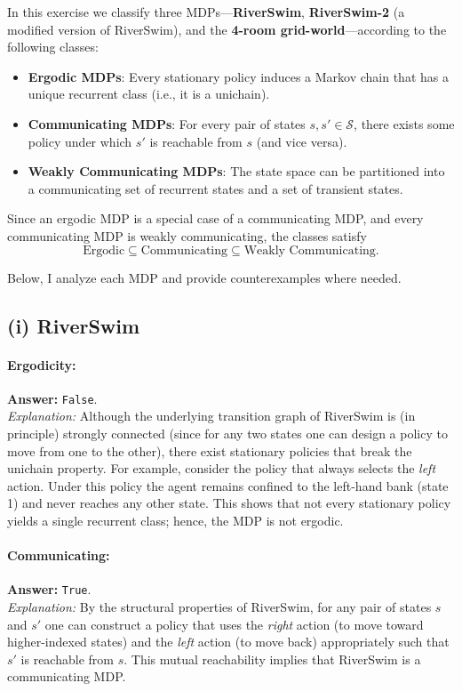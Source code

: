 In this exercise we classify three MDPs---\textbf{RiverSwim}, \textbf{RiverSwim-2} (a modified version of RiverSwim), and the \textbf{4-room grid-world}---according to the following classes:
\begin{itemize}
    \item \textbf{Ergodic MDPs}: Every stationary policy induces a Markov chain that has a unique recurrent class (i.e., it is a unichain).
    \item \textbf{Communicating MDPs}: For every pair of states $s, s' \in \mathcal{S}$, there exists some policy under which $s'$ is reachable from $s$ (and vice versa).
    \item \textbf{Weakly Communicating MDPs}: The state space can be partitioned into a communicating set of recurrent states and a set of transient states.
\end{itemize}
Since an ergodic MDP is a special case of a communicating MDP, and every communicating MDP is weakly communicating, the classes satisfy
\[
\text{Ergodic} \subseteq \text{Communicating} \subseteq \text{Weakly Communicating}.
\]

Below, I analyze each MDP and provide counterexamples where needed.

\subsection*{(i) RiverSwim}

\paragraph{Ergodicity:}  
\textbf{Answer:} \texttt{False}.\\[0.5em]
\textit{Explanation:}  
Although the underlying transition graph of RiverSwim is (in principle) strongly connected (since for any two states one can design a policy to move from one to the other), there exist stationary policies that break the unichain property. For example, consider the policy that always selects the \emph{left} action. Under this policy the agent remains confined to the left-hand bank (state 1) and never reaches any other state. This shows that not every stationary policy yields a single recurrent class; hence, the MDP is not ergodic.

\paragraph{Communicating:}  
\textbf{Answer:} \texttt{True}.\\[0.5em]
\textit{Explanation:}  
By the structural properties of RiverSwim, for any pair of states $s$ and $s'$ one can construct a policy that uses the \emph{right} action (to move toward higher-indexed states) and the \emph{left} action (to move back) appropriately such that $s'$ is reachable from $s$. This mutual reachability implies that RiverSwim is a communicating MDP.

